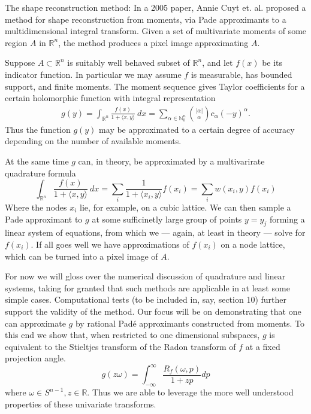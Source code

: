 \documentclass{amsart}
\theoremstyle{remark}
\numberwithin{equation}{section}
\newcommand{\RR}{\mathbb{R}}
\newcommand{\NN}{\mathbb{N}}
\begin{document}

The shape reconstruction method: In a 2005 paper, Annie Cuyt et. al. \cite{Cuyt05} proposed a method for shape reconstruction from moments, via Pade approximants to a multidimensional integral transform. Given a set of multivariate moments of some region $A$ in $\RR^n$, the method produces a pixel image approximating $A$. 

Suppose $A \subset \RR^n$ is suitably well behaved subset of $\RR^n$, and let $f(x)$ be its indicator function. In particular we may assume $f$ is measurable, has bounded support, and finite moments. The moment sequence gives Taylor coefficients for a certain holomorphic function with integral representation
\begin{align*}
    g(y) = \int_{\RR^n} \frac{f(x)}{1 + \langle x, y\rangle} ~dx = \sum_{\alpha \in \NN_0^n} \binom{|\alpha|}{\alpha} c_\alpha {(-y)}^\alpha.
\end{align*}
Thus the function $g(y)$ may be approximated to a certain degree of accuracy depending on the number of available moments.

At the same time $g$ can, in theory, be approximated by a multivarirate quadrature formula
\[
    \int_{\RR^n} \frac{f(x)}{1 + \langle x, y\rangle} ~dx
    = \sum_{i} \frac1{1+\langle x_i, y\rangle} f(x_i)
    = \sum_{i} w(x_i, y) f(x_i)
\]
Where the nodes $x_i$ lie, for example, on a cubic lattice. We can then sample a Pade approximant to $g$ at some sufficinetly large group of points $y = y_j$ forming a linear system of equations, from which we — again, at least in theory — solve for $f(x_i)$. If all goes well we have approximations of $f(x_i)$ on a node lattice, which can be turned into a pixel image of $A$.

For now we will gloss over the numerical discussion of quadrature and linear systems, taking for granted that such methods are applicable in at least some simple cases. Computational tests (to be included in, say, section 10) further support the validity of the method. Our focus will be on demonstrating that one can approximate $g$ by rational Pad\'e approximants constructed from moments. To this end we show that, when restricted to one dimensional subspaces, $g$ is equivalent to the Stieltjes transform of the Radon transform of $f$ at a fixed projection angle. 
\[
    g(z\omega) = \int_{-\infty}^\infty \frac{R_f(\omega,p)}{1 + zp}dp
\]
where $\omega \in S^{n-1}, z\in \RR$. Thus we are able to leverage the more well understood properties of these univariate transforms. 
\end{document}

